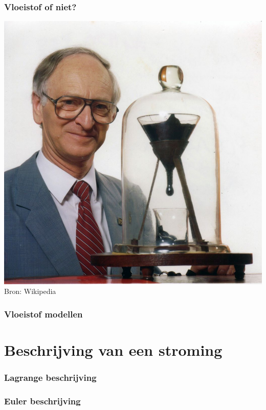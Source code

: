 \documentclass[t]{beamer}
\begin{document}
  		\begin{frame}
  			\frametitle{Vloeistof of niet?}
			\center
    		\includegraphics[height=0.8\textheight]{../fig/basisbegrippen/teer.png}\\
			\footnotesize{Bron: Wikipedia}
  		\end{frame}
  	
  		\begin{frame}
  			\frametitle{Vloeistof modellen}
			\center
			
  		\end{frame}
  	\section{Beschrijving van een stroming}
  		\begin{frame}
  			\frametitle{Lagrange beschrijving}
  			\vspace{2cm}
			\center
			
  		\end{frame}
  		\begin{frame}
  			\frametitle{Euler beschrijving}
  			\vspace{1cm}
			\center
			
			
  		\end{frame}
\end{document}

